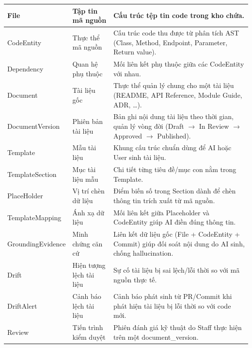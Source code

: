 \begin{longtable}{|p{}|p{}|p{}|}
File
&
Tập tin mã nguồn
&
Cấu trúc tệp tin code trong kho chứa.
\\
\hline

CodeEntity
&
Thực thể mã nguồn
&
Cấu trúc code thu được từ phân tích AST (Class, Method, Endpoint, Parameter, Return value).
\\
\hline

Dependency
&
Quan hệ phụ thuộc
&
Mối liên kết phụ thuộc giữa các CodeEntity với nhau.
\\
\hline

Document
&
Tài liệu gốc
&
Thực thể quản lý chung cho một tài liệu (README, API Reference, Module Guide, ADR, \ldots).
\\
\hline

DocumentVersion
&
Phiên bản tài liệu
&
Bản ghi nội dung tài liệu theo thời gian, quản lý vòng đời (Draft $\rightarrow$ In Review $\rightarrow$ Approved $\rightarrow$ Published).
\\
\hline

Template
&
Mẫu tài liệu
&
Khung cấu trúc chuẩn dùng để AI hoặc User sinh tài liệu.
\\
\hline

TemplateSection
&
Mục tài liệu mẫu
&
Chi tiết từng tiêu đề/mục con nằm trong Template.
\\
\hline

PlaceHolder
&
Vị trí chèn dữ liệu
&
Điểm biến số trong Section dành để chèn thông tin trích xuất từ mã nguồn.
\\
\hline

TemplateMapping
&
Ánh xạ dữ liệu
&
Mối liên kết giữa Placeholder và CodeEntity giúp AI điền đúng thông tin.
\\
\hline

GroundingEvidence
&
Minh chứng căn cứ
&
Liên kết dữ liệu gốc (File + CodeEntity + Commit) giúp đối soát nội dung do AI sinh, chống hallucination.
\\
\hline

Drift
&
Hiện tượng lệch tài liệu
&
Sự cố tài liệu bị sai lệch/lỗi thời so với mã nguồn thực tế.
\\
\hline

DriftAlert
&
Cảnh báo lệch tài liệu
&
Cảnh báo phát sinh từ PR/Commit khi phát hiện tài liệu bị lỗi thời so với code mới.
\\
\hline

Review
&
Tiến trình kiểm duyệt
&
Phiên đánh giá kỹ thuật do Staff thực hiện trên một document\_version.
\\
\hline


\end{longtable}
